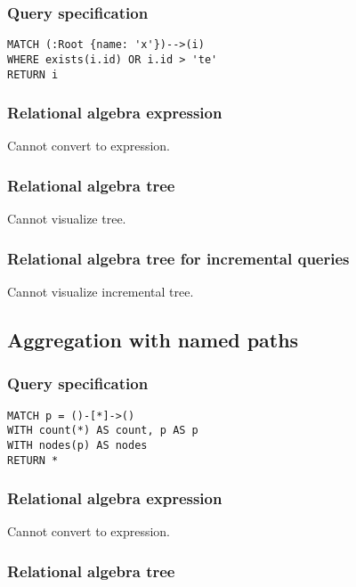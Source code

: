 \subsubsection*{Query specification}

\begin{lstlisting}
MATCH (:Root {name: 'x'})-->(i)
WHERE exists(i.id) OR i.id > 'te'
RETURN i
\end{lstlisting}

\subsubsection*{Relational algebra expression}

Cannot convert to expression.

\subsubsection*{Relational algebra tree}

Cannot visualize tree.

\subsubsection*{Relational algebra tree for incremental queries}

Cannot visualize incremental tree.

\subsection{Aggregation with named paths}

\subsubsection*{Query specification}

\begin{lstlisting}
MATCH p = ()-[*]->()
WITH count(*) AS count, p AS p
WITH nodes(p) AS nodes
RETURN *
\end{lstlisting}

\subsubsection*{Relational algebra expression}

Cannot convert to expression.

\subsubsection*{Relational algebra tree}

